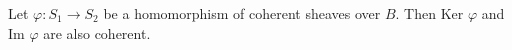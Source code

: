 Let $\varphi: S_1 \rightarrow S_2$ be a homomorphism of coherent sheaves over $B$. Then Ker $\varphi$ and Im $\varphi$ are also coherent.
